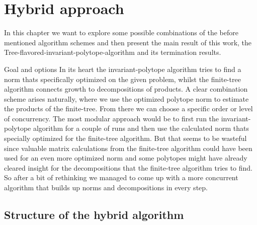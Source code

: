 
\chapter{Hybrid approach} 
\label{ch:hybrid}

In this chapter we want to explore some possible combinations of the before mentioned algorithm schemes and then present the main result of this work, the Tree-flavored-invariant-polytope-algorithm and its termination results. 

\begin{section}{Goal and options}
In its heart the invariant-polytope algorithm tries to find a norm thats specifically optimized on the given problem, whilst the finite-tree algorithm connects growth to decompositions of products. A clear combination scheme arises naturally, where we use the optimized polytope norm to estimate the products of the finite-tree. From there we can choose a specific order or level of concurrency.
\newline
The most modular approach would be to first run the invariant-polytope algorithm for a couple of runs and then use the calculated norm thats specially optimized for the finite-tree algorithm. But that seems to be wasteful since valuable matrix calculations from the finite-tree algorithm could have been used for an even more optimized norm and some polytopes might have already cleared insight for the decompositions that the finite-tree algorithm tries to find. So after a bit of rethinking we managed to come up with a more concurrent algorithm that builds up norms and decompositions in every step. 
\end{section}



\section{Structure of the hybrid algorithm}

